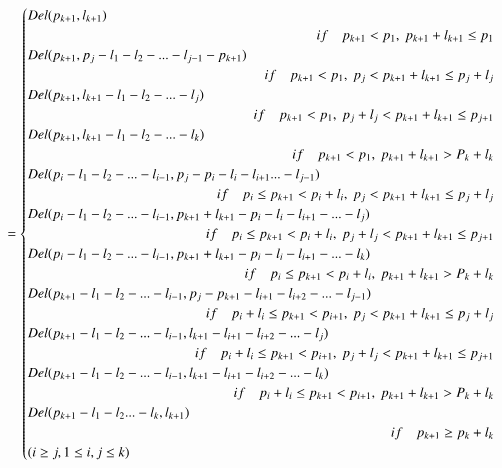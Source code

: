 \begin{equation}
= \begin{cases}
Del(p_{k+1},l_{k+1}) \\ \quad \hfill if \quad p_{k+1} < p_1,\ p_{k+1}+l_{k+1} \le p_1 \\
Del(p_{k+1},p_j-l_1-l_2-...-l_{j-1}-p_{k+1}) \\ \quad \hfill if \quad p_{k+1} < p_1,\ p_j < p_{k+1}+l_{k+1} \le p_j+l_j \\
Del(p_{k+1},l_{k+1}-l_1-l_2-...-l_j) \\  \quad \hfill if \quad p_{k+1} < p_1 ,\ p_j+l_j < p_{k+1}+l_{k+1} \le p_{j+1} \\
Del(p_{k+1},l_{k+1}-l_1-l_2-...-l_k) \\  \quad \hfill if \quad p_{k+1} < p_1 ,\ p_{k+1}+l_{k+1} > P_k+l_k  \\

Del(p_i-l_1-l_2-...-l_{i-1},p_j-p_i-l_i-l_{i+1}...-l_{j-1})        \\  \quad  \hfill if \quad p_i \le p_{k+1} < p_i+l_i ,\ p_j < p_{k+1}+l_{k+1} \le p_j+l_j \\
Del(p_i-l_1-l_2-...-l_{i-1},p_{k+1}+l_{k+1}-p_i-l_i-l_{i+1}-...-l_j) \quad \quad \quad \quad \quad \quad \quad \quad \quad \\  \quad \hfill if \quad p_i \le p_{k+1} < p_i+l_i ,\ p_j+l_j < p_{k+1}+l_{k+1} \le p_{j+1} \\
Del(p_i-l_1-l_2-...-l_{i-1},p_{k+1}+l_{k+1}-p_i-l_i-l_{i+1}-...-l_k) \\  \quad \hfill if \quad p_i \le p_{k+1} < p_i+l_i ,\ p_{k+1}+l_{k+1} > P_k+l_k  \\


Del(p_{k+1}-l_1-l_2-...-l_{i-1},p_j-p_{k+1}-l_{i+1}-l_{i+2}-...-l_{j-1})    \\   \quad \hfill if \quad p_i+l_i \le p_{k+1} < p_{i+1} ,\  p_j < p_{k+1}+l_{k+1} \le p_j+l_j \\
Del(p_{k+1}-l_1-l_2-...-l_{i-1},l_{k+1}-l_{i+1}-l_{i+2}-...-l_j)    \\   \quad \hfill if \quad  p_i+l_i \le p_{k+1} < p_{i+1} ,\ p_j+l_j < p_{k+1}+l_{k+1} \le p_{j+1} \\
Del(p_{k+1}-l_1-l_2-...-l_{i-1},l_{k+1}-l_{i+1}-l_{i+2}-...-l_k)    \\  \quad \hfill if \quad p_i+l_i \le p_{k+1} < p_{i+1} ,\ p_{k+1}+l_{k+1} > P_k+l_k  \\
Del(p_{k+1}-l_1-l_2...-l_k,l_{k+1}) \\  \quad \hfill if \quad p_{k+1} \ge p_k+l_k \\
(i \ge j,1 \le i,j \le k)
 \end{cases}
\end{equation}



